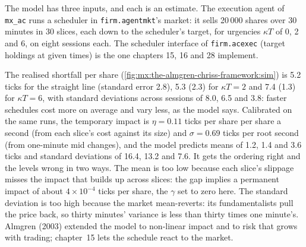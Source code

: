 The model has three inputs, and each is an estimate. The execution agent of \texttt{mx\_ac} runs a scheduler in \texttt{firm.agentmkt}'s market: it sells
20\,000 shares over 30 minutes in 30 slices, each down to the scheduler's target, for urgencies $\kappa T$ of 0, 2 and 6, on eight sessions each. The
scheduler interface of \texttt{firm.acexec} (target holdings at given times) is the one chapters 15, 16 and 28 implement.

\label{lst:mx:the-almgren-chriss-framework:agent}

The realised shortfall per share (\cref{fig:mx:the-almgren-chriss-framework:sim}) is 5.2 ticks for the straight line (standard error 2.8), 5.3 (2.3) for
$\kappa T=2$ and 7.4 (1.3) for $\kappa T=6$, with standard deviations across sessions of 8.0, 6.5 and 3.8: faster schedules cost more on average and vary
less, as the model says. Calibrated on the same runs, the temporary impact is $\eta=0.11$ ticks per share per share a second (from each slice's cost
against its size) and $\sigma=0.69$ ticks per root second (from one-minute mid changes), and the model predicts means of 1.2, 1.4 and 3.6 ticks and standard
deviations of 16.4, 13.2 and 7.6. It gets the ordering right and the levels wrong in two ways. The mean is too low because each slice's slippage misses the
impact that builds up across slices: the gap implies a permanent impact of about $4\times10^{-4}$ ticks per share, the $\gamma$ set to zero here. The
standard deviation is too high because the market mean-reverts: its fundamentalists pull the price back, so thirty minutes' variance is less than thirty
times one minute's. Almgren (2003) extended the model to non-linear impact and to risk that grows with trading; chapter~15 lets the schedule react to the
market.

